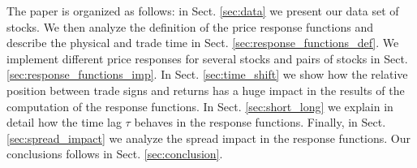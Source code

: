 The paper is organized as follows: in Sect. \ref{sec:data} we present our data
set of stocks. We then analyze the definition of the price response functions
and describe the physical and trade time in Sect.
\ref{sec:response_functions_def}. We implement different price responses for
several stocks and pairs of stocks in Sect. \ref{sec:response_functions_imp}.
In Sect. \ref{sec:time_shift} we show how the relative position between trade
signs and returns has a huge impact in the results of the computation of the
response functions. In Sect. \ref{sec:short_long} we explain in detail how the
time lag $\tau$ behaves in the response functions. Finally, in Sect.
\ref{sec:spread_impact} we analyze the spread impact in the response functions.
 Our conclusions follows in Sect. \ref{sec:conclusion}.